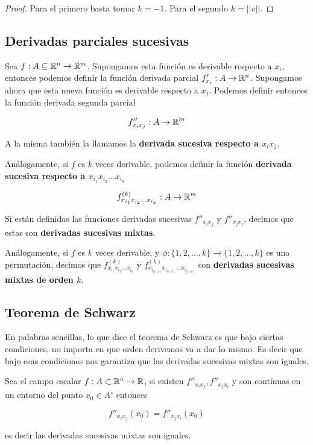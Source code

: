 \begin{proof}
Para el primero basta tomar $k = -1$.  Para el segundo $k = ||v||$.
\end{proof}

\subsection{Derivadas parciales sucesivas}

\begin{definition}
Sea $f: A \subseteq \mathbb{R}^n \to \mathbb{R}^m$.  Supongamos esta función es derivable respecto a $x_i$, entonces podemos definir la función derivada parcial $f'_{x_i} : A \to \mathbb{R}^n$.  Supongamos ahora que esta nueva función es derivable  respecto a $x_j$.  Podemos definir entonces la función derivada segunda parcial

$$ f''_{x_i x_j} : A \to \mathbb{R}^m $$

A la misma también la llamamos la \textbf{derivada sucesiva respecto a $x_i x_j$}.

Análogamente, si $f$ es $k$ veces derivable, podemos definir la función \textbf{derivada sucesiva respecto a $x_{i_1} x_{i_2} \ldots x_{i_k}$}

$$ f^{(k)}_{x_{i_1} x_{i_2} \ldots x_{i_k}} : A \to \mathbb{R}^m $$

Si están definidas las funciones derivadas sucesivas $f''_{x_i x_j}$ y $f''_{x_j x_i}$, decimos que estas son \textbf{derivadas sucesivas mixtas}.

Análogamente, si $f$ es $k$ veces derivable, y $\phi : \{1,2, \ldots, k\} \to \{1, 2, \ldots, k\}$ es una permutación, decimos que $f^{(k)}_{x_{i_1} x_{i_2} \ldots x_{i_k}}$ y $f^{(k)}_{x_{i_{\phi(1)}} x_{i_{\phi(2)}} \ldots x_{i_{\phi(k)}}}$ son \textbf{derivadas sucesivas mixtas de orden $k$}.
\end{definition}

\subsection{Teorema de Schwarz}

En palabras sencillas, lo que dice el teorema de Schwarz es que bajo ciertas condiciones, no importa en que orden derivemos va a dar lo mismo.  Es decir que bajo esas condiciones nos garantiza que las derivadas sucesivas mixtas son iguales.

\begin{theorem}[Schwarz] \label{schwarz} 
Sea el campo escalar $ f : A \subset \mathbb{R}^n \to \mathbb{R}$, si existen $ f''_{x_i x_j}, f''_{x_j x_i}$ y son contínuas en un entorno del punto $ x_0 \in A^{\circ}$ entonces 

$$ f''_{x_i x_j}(x_0) = f''_{x_j x_i}(x_0) $$

es decir las derivadas sucesivas mixtas son iguales.
\end{theorem}

